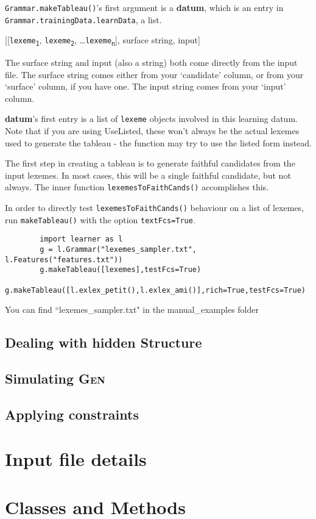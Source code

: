 \documentclass[12]{article}
\begin{document}
	\texttt{Grammar.makeTableau()}'s first argument is a {\bf datum}, which is an entry in \texttt{Grammar.trainingData.learnData}, a list.
	
	\begin{exe}
		  [[\texttt{lexeme\textsubscript{1}}, \texttt{lexeme\textsubscript{2}}, \ldots \texttt{lexeme\textsubscript{n}}], surface string, input]
	\end{exe}

	The surface string and input (also a string) both come directly from the input file.  The surface string comes either from your `candidate' column, or from your `surface' column, if you have one.  The input string comes from your `input' column.
	
	{\bf datum}'s first entry is a list of \texttt{lexeme} objects involved in this learning datum.  Note that if you are using UseListed, these won't always be the actual lexemes used to generate the tableau - the function may try to use the listed form instead.
	
	The first step in creating a tableau is to generate faithful candidates from the input lexemes.  In most cases, this will be a single faithful candidate, but not always.  The inner function \texttt{lexemesToFaithCands()} accomplishes this.
	
	In order to directly test \texttt{lexemesToFaithCands()} behaviour on a list of lexemes, run \texttt{makeTableau()} with the option \texttt{textFcs=True}.
	
	\begin{verbatim}
		import learner as l
		g = l.Grammar("lexemes_sampler.txt", l.Features("features.txt"))
		g.makeTableau([lexemes],testFcs=True)
		g.makeTableau([l.exlex_petit(),l.exlex_ami()],rich=True,testFcs=True)
	\end{verbatim}
	
	You can find ``lexemes\_sampler.txt" in the manual\_examples folder
	
	\subsection{Dealing with hidden Structure}
	\subsection{Simulating \textsc{Gen}}
	\subsection{Applying constraints}

\section{Input file details}

\section{Classes and Methods}
\end{document}
